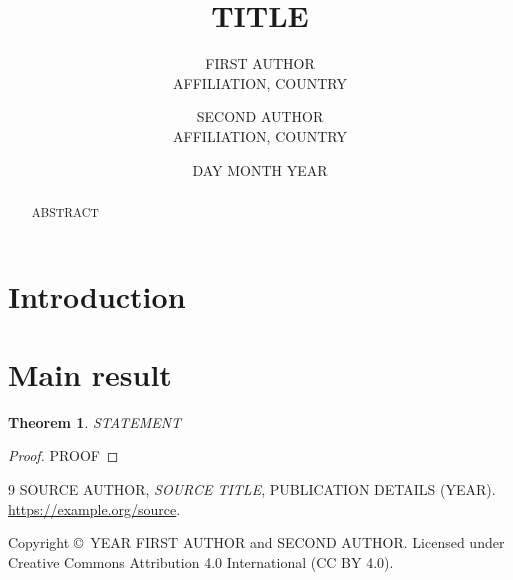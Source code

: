 \documentclass[11pt,a4paper]{article}
\title{TITLE}
\author{FIRST AUTHOR\\\small AFFILIATION, COUNTRY
\and SECOND AUTHOR\\\small AFFILIATION, COUNTRY}
\date{DAY MONTH YEAR}
\newtheorem{theorem}{Theorem}
\theoremstyle{definition}
\theoremstyle{remark}
\begin{document}
\maketitle

\begin{abstract}
ABSTRACT
\end{abstract}

\section{Introduction}

\section{Main result}

\begin{theorem}\label{thm:main}
STATEMENT
\end{theorem}

\begin{proof}
PROOF
\end{proof}


\begin{thebibliography}{9}
 SOURCE AUTHOR, \emph{SOURCE TITLE}, PUBLICATION DETAILS (YEAR).
\url{https://example.org/source}.
\end{thebibliography}
% 
% 

\smallskip
\noindent\small Copyright \copyright\ YEAR FIRST AUTHOR and SECOND AUTHOR.
Licensed under Creative Commons Attribution 4.0 International (CC BY 4.0).
\end{document}
